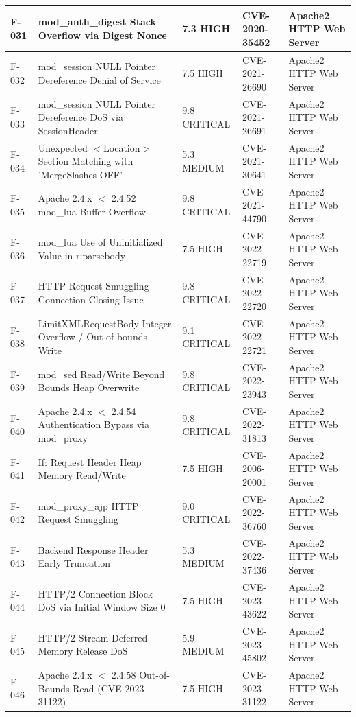 \begin{longtable}{|l|p{5cm}|l|l|p{3cm}|}
F-031 & mod\_auth\_digest Stack Overflow via Digest Nonce & 7.3 HIGH & CVE-2020-35452 & Apache2 HTTP Web Server\\ \hline
F-032 & mod\_session NULL Pointer Dereference Denial of Service & 7.5 HIGH & CVE-2021-26690 & Apache2 HTTP Web Server\\ \hline
F-033 & mod\_session NULL Pointer Dereference DoS via SessionHeader & 9.8 CRITICAL & CVE-2021-26691 & Apache2 HTTP Web Server\\ \hline
F-034 & Unexpected $<$Location$>$ Section Matching with 'MergeSlashes OFF' & 5.3 MEDIUM & CVE-2021-30641 & Apache2 HTTP Web Server\\ \hline
F-035 & Apache 2.4.x $<$ 2.4.52 mod\_lua Buffer Overflow & 9.8 CRITICAL & CVE-2021-44790 & Apache2 HTTP Web Server\\ \hline
F-036 & mod\_lua Use of Uninitialized Value in r:parsebody & 7.5 HIGH & CVE-2022-22719 & Apache2 HTTP Web Server\\ \hline
F-037 & HTTP Request Smuggling Connection Closing Issue & 9.8 CRITICAL & CVE-2022-22720 & Apache2 HTTP Web Server\\ \hline
F-038 & LimitXMLRequestBody Integer Overflow / Out-of-bounds Write & 9.1 CRITICAL & CVE-2022-22721 & Apache2 HTTP Web Server\\ \hline
F-039 & mod\_sed Read/Write Beyond Bounds Heap Overwrite & 9.8 CRITICAL & CVE-2022-23943 & Apache2 HTTP Web Server\\ \hline
F-040 & Apache 2.4.x $<$ 2.4.54 Authentication Bypass via mod\_proxy & 9.8 CRITICAL & CVE-2022-31813 & Apache2 HTTP Web Server\\ \hline
F-041 & If: Request Header Heap Memory Read/Write & 7.5 HIGH & CVE-2006-20001 & Apache2 HTTP Web Server\\ \hline
F-042 & mod\_proxy\_ajp HTTP Request Smuggling & 9.0 CRITICAL & CVE-2022-36760 & Apache2 HTTP Web Server\\ \hline
F-043 & Backend Response Header Early Truncation & 5.3 MEDIUM & CVE-2022-37436 & Apache2 HTTP Web Server\\ \hline
F-044 & HTTP/2 Connection Block DoS via Initial Window Size 0 & 7.5 HIGH & CVE-2023-43622 & Apache2 HTTP Web Server\\ \hline
F-045 & HTTP/2 Stream Deferred Memory Release DoS & 5.9 MEDIUM & CVE-2023-45802 & Apache2 HTTP Web Server\\ \hline
F-046 & Apache 2.4.x $<$ 2.4.58 Out-of-Bounds Read (CVE-2023-31122) & 7.5 HIGH & CVE-2023-31122 & Apache2 HTTP Web Server\\ \hline

\end{longtable}
